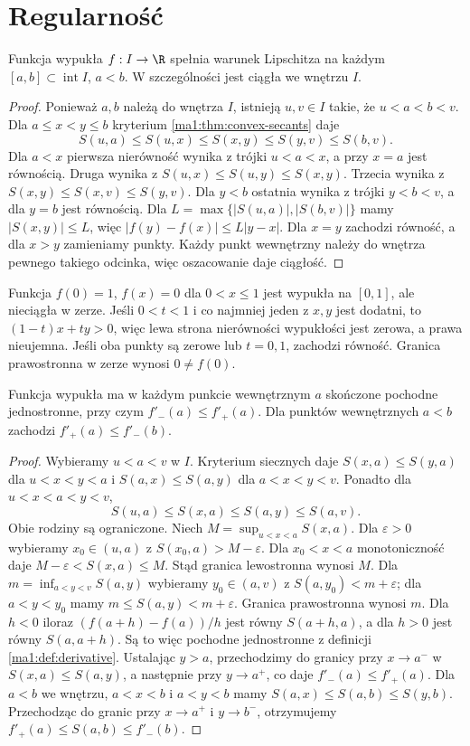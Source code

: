 \section{Regularność}
\begin{twierdzenie}
\label{ma1:thm:convex-local-lipschitz}
Funkcja wypukła $f:I\to\R$ spełnia warunek Lipschitza na każdym $[a,b]\subset\operatorname{int}I$, $a<b$. W szczególności jest ciągła we wnętrzu $I$.
\end{twierdzenie}
\begin{proof}
Ponieważ $a,b$ należą do wnętrza $I$, istnieją $u,v\in I$ takie, że $u<a<b<v$. Dla $a\le x<y\le b$ kryterium \ref{ma1:thm:convex-secants} daje
\[
 S(u,a)\le S(u,x)\le S(x,y)\le S(y,v)\le S(b,v).
\]
Dla $a<x$ pierwsza nierówność wynika z trójki $u<a<x$, a przy $x=a$ jest równością. Druga wynika z $S(u,x)\le S(u,y)\le S(x,y)$. Trzecia wynika z $S(x,y)\le S(x,v)\le S(y,v)$. Dla $y<b$ ostatnia wynika z trójki $y<b<v$, a dla $y=b$ jest równością. Dla $L=\max\{|S(u,a)|,|S(b,v)|\}$ mamy $|S(x,y)|\le L$, więc $|f(y)-f(x)|\le L|y-x|$. Dla $x=y$ zachodzi równość, a dla $x>y$ zamieniamy punkty. Każdy punkt wewnętrzny należy do wnętrza pewnego takiego odcinka, więc oszacowanie daje ciągłość.
\end{proof}
\begin{przyklad}
\label{ma1:ex:convex-endpoint}
Funkcja $f(0)=1$, $f(x)=0$ dla $0<x\le1$ jest wypukła na $[0,1]$, ale nieciągła w zerze. Jeśli $0<t<1$ i co najmniej jeden z $x,y$ jest dodatni, to $(1-t)x+ty>0$, więc lewa strona nierówności wypukłości jest zerowa, a prawa nieujemna. Jeśli oba punkty są zerowe lub $t=0,1$, zachodzi równość. Granica prawostronna w zerze wynosi $0\ne f(0)$.
\end{przyklad}
\begin{twierdzenie}
\label{ma1:thm:convex-one-sided-derivatives}
Funkcja wypukła ma w każdym punkcie wewnętrznym $a$ skończone pochodne jednostronne, przy czym $f'_-(a)\le f'_+(a)$. Dla punktów wewnętrznych $a<b$ zachodzi $f'_+(a)\le f'_-(b)$.
\end{twierdzenie}
\begin{proof}
Wybieramy $u<a<v$ w $I$. Kryterium siecznych daje $S(x,a)\le S(y,a)$ dla $u<x<y<a$ i $S(a,x)\le S(a,y)$ dla $a<x<y<v$. Ponadto dla $u<x<a<y<v$,
\[
 S(u,a)\le S(x,a)\le S(a,y)\le S(a,v).
\]
Obie rodziny są ograniczone. Niech $M=\sup_{u<x<a}S(x,a)$. Dla $\varepsilon>0$ wybieramy $x_0\in(u,a)$ z $S(x_0,a)>M-\varepsilon$. Dla $x_0<x<a$ monotoniczność daje $M-\varepsilon<S(x,a)\le M$. Stąd granica lewostronna wynosi $M$. Dla $m=\inf_{a<y<v}S(a,y)$ wybieramy $y_0\in(a,v)$ z $S(a,y_0)<m+\varepsilon$; dla $a<y<y_0$ mamy $m\le S(a,y)<m+\varepsilon$. Granica prawostronna wynosi $m$. Dla $h<0$ iloraz $(f(a+h)-f(a))/h$ jest równy $S(a+h,a)$, a dla $h>0$ jest równy $S(a,a+h)$. Są to więc pochodne jednostronne z definicji \ref{ma1:def:derivative}. Ustalając $y>a$, przechodzimy do granicy przy $x\to a^-$ w $S(x,a)\le S(a,y)$, a następnie przy $y\to a^+$, co daje $f'_-(a)\le f'_+(a)$.
Dla $a<b$ we wnętrzu, $a<x<b$ i $a<y<b$ mamy $S(a,x)\le S(a,b)\le S(y,b)$. Przechodząc do granic przy $x\to a^+$ i $y\to b^-$, otrzymujemy $f'_+(a)\le S(a,b)\le f'_-(b)$.
\end{proof}


